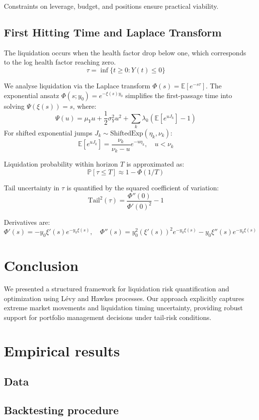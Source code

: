 \documentclass{article} %
\theoremstyle{plain}
\theoremstyle{definition} %
\begin{document}
Constraints on leverage, budget, and positions ensure practical viability.


\subsection{First Hitting Time and Laplace Transform}
The liquidation occurs when the health factor drop below one, which corresponds to the log health factor reaching zero. 
\[
\tau = \inf\{ t \geq 0 : Y(t) \leq 0 \}
\]

We analyse liquidation via the Laplace transform $\Phi(s) = \mathbb{E}[e^{-s\tau}]$. The exponential ansatz $\Phi(s; y_0) = e^{-\xi(s) y_0}$ simplifies the first-passage time into solving $\Psi(\xi(s)) = s$, where:
\[
\Psi(u) = \mu_Y u + \frac{1}{2}\sigma_Y^2 u^2 + \sum_k \lambda_k\left(\mathbb{E}[e^{u J_k}] - 1\right)
\]
For shifted exponential jumps $J_k \sim \text{ShiftedExp}(\eta_k, \nu_k)$:
\[
\mathbb{E}[e^{u J_k}] = \frac{\nu_k}{\nu_k - u}e^{-u\eta_k}, \quad u < \nu_k
\]

Liquidation probability within horizon $T$ is approximated as:
\[
\mathbb{P}[\tau \leq T] \approx 1 - \Phi(1/T)
\]

Tail uncertainty in $\tau$ is quantified by the squared coefficient of variation:
\[
\text{Tail}^2(\tau) = \frac{\Phi''(0)}{\Phi'(0)^2}-1
\]

Derivatives are:
\[
\Phi'(s) = -y_0 \xi'(s)e^{-y_0\xi(s)}, \quad \Phi''(s)=y_0^2(\xi'(s))^2e^{-y_0\xi(s)} - y_0\xi''(s)e^{-y_0\xi(s)}
\]


\section{Conclusion}
We presented a structured framework for liquidation risk quantification and optimization using Lévy and Hawkes processes. Our approach explicitly captures extreme market movements and liquidation timing uncertainty, providing robust support for portfolio management decisions under tail-risk conditions.

\section{Empirical results}
\subsection{Data}
\subsection{Backtesting procedure}
\end{document}
